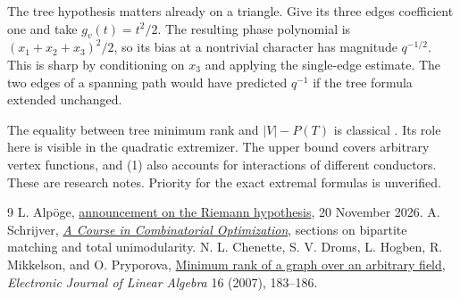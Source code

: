 \documentclass[10pt]{article}
\begin{document}
The tree hypothesis matters already on a triangle. Give its three
edges coefficient one and take $g_v(t)=t^2/2$. The resulting phase
polynomial is $(x_1+x_2+x_3)^2/2$, so its bias at a nontrivial character
has magnitude $q^{-1/2}$. This is sharp by conditioning on $x_3$ and
applying the single-edge estimate. The two edges of a spanning path
would have predicted $q^{-1}$ if the tree formula extended unchanged.

The equality between tree minimum rank and $|V|-P(T)$ is classical
\cite[Thm.~2.2]{chenette}. Its role here is visible in the quadratic
extremizer. The upper bound covers arbitrary vertex functions, and (1)
also accounts for interactions of different conductors. These are
research notes. Priority for the exact extremal formulas is unverified.

\begin{thebibliography}{9}
 L. Alp\"oge, \href{https://alpo.ge/remark.pdf}{announcement
on the Riemann hypothesis}, 20 November 2026.
 A. Schrijver,
\href{https://www-users.cse.umn.edu/~reiner/Classes/Schrijver2004.pdf}
{\emph{A Course in Combinatorial Optimization}}, sections on bipartite
matching and total unimodularity.
 N. L. Chenette, S. V. Droms, L. Hogben, R. Mikkelson,
and O. Pryporova, \href{https://emis.de/ft/34661}{Minimum rank of a graph
over an arbitrary field}, \emph{Electronic Journal of Linear Algebra}
16 (2007), 183--186.
\end{thebibliography}
\end{document}

